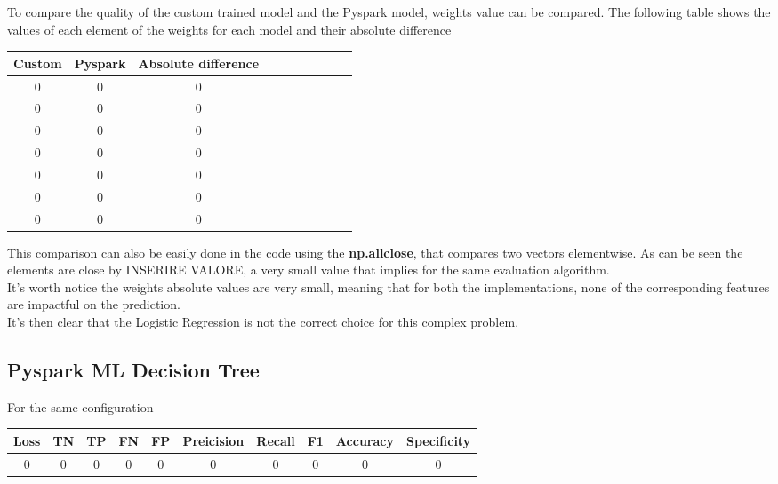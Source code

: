 \documentclass[
	letterpaper, %
	10pt, %
]{class}
\begin{document}
To compare the quality of the custom trained model and the Pyspark model, weights value can be compared. The following table shows the values of each element of the weights for each model and their absolute difference

\begin{center}
    \begin{tabular}{ |c|c|c|c|c|c|c|c|c|c| }
        \hline
        Custom & Pyspark & Absolute difference \\
        \hline
        0      & 0       & 0                   \\
        0      & 0       & 0                   \\
        0      & 0       & 0                   \\
        0      & 0       & 0                   \\
        0      & 0       & 0                   \\
        0      & 0       & 0                   \\
        0      & 0       & 0                   \\
        \hline
    \end{tabular}
\end{center}

This comparison can also be easily done in the code using the \textbf{np.allclose}, that compares two vectors elementwise.
As can be seen the elements are close by INSERIRE VALORE, a very small value that implies for the same evaluation algorithm.\\

It's worth notice the weights absolute values are very small, meaning that for both the implementations, none of the corresponding features are impactful on the prediction.\\
It's then clear that the Logistic Regression is not the correct choice for this complex problem.

\subsection{Pyspark ML Decision Tree}

For the same configuration

\begin{center}
    \begin{tabular}{ |c|c|c|c|c|c|c|c|c|c| }
        \hline
        Loss & TN & TP & FN & FP & Preicision & Recall & F1 & Accuracy & Specificity \\
        \hline
        0    & 0  & 0  & 0  & 0  & 0          & 0      & 0  & 0        & 0           \\
        \hline
    \end{tabular}
\end{center}
\end{document}
